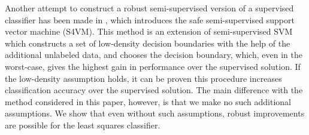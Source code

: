 \documentclass{llncs}
\begin{document}








Another attempt to construct a robust semi-supervised version of a supervised classifier has been made in \cite{Li2015}, which introduces the safe semi-supervised support vector machine (S4VM). 
This method is an extension of semi-supervised SVM \cite{Bennett1998} which constructs a set of low-density decision boundaries with the help of the additional unlabeled data, and chooses the decision boundary, which, even in the worst-case, gives the highest gain in performance over the supervised solution. 
If the low-density assumption holds, it can be proven this procedure increases classification accuracy over the supervised solution. 
The main difference with the method considered in this paper, however, is that we make no such additional assumptions. We show that even without such assumptions, robust improvements are possible for the least squares classifier.
\end{document}
